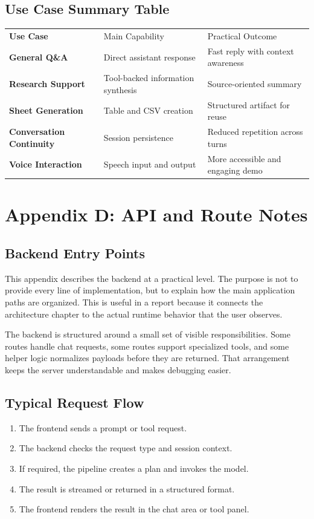 \documentclass[11pt,oneside]{report}
\begin{document}
\section{Use Case Summary Table}
\begin{tabularx}{\textwidth}{>{\bfseries}p{}p{}X}
Use Case & Main Capability & Practical Outcome \\
General Q\&A & Direct assistant response & Fast reply with context awareness \\
Research Support & Tool-backed information synthesis & Source-oriented summary \\
Sheet Generation & Table and CSV creation & Structured artifact for reuse \\
Conversation Continuity & Session persistence & Reduced repetition across turns \\
Voice Interaction & Speech input and output & More accessible and engaging demo \\
\end{tabularx}

\chapter{Appendix D: API and Route Notes}
\section{Backend Entry Points}
This appendix describes the backend at a practical level. The purpose is not to provide every line of implementation, but to explain how the main application paths are organized. This is useful in a report because it connects the architecture chapter to the actual runtime behavior that the user observes.

The backend is structured around a small set of visible responsibilities. Some routes handle chat requests, some routes support specialized tools, and some helper logic normalizes payloads before they are returned. That arrangement keeps the server understandable and makes debugging easier.

\section{Typical Request Flow}
\begin{enumerate}[leftmargin=1.2cm]
  \item The frontend sends a prompt or tool request.
  \item The backend checks the request type and session context.
  \item If required, the pipeline creates a plan and invokes the model.
  \item The result is streamed or returned in a structured format.
  \item The frontend renders the result in the chat area or tool panel.
\end{enumerate}
\end{document}
